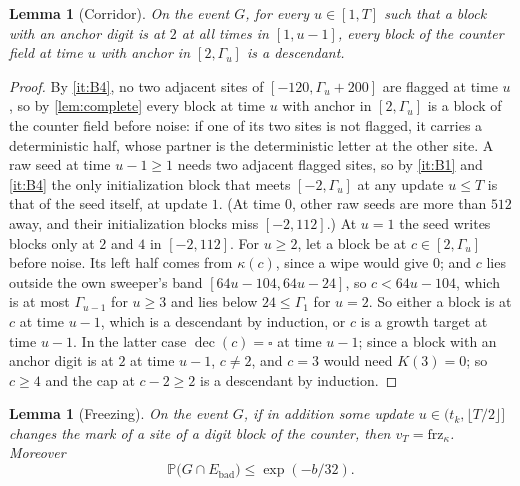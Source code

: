 \documentclass[11pt]{article}
\theoremstyle{plain}
\newtheorem{lemma}[theorem]{Lemma}
\theoremstyle{definition}
\theoremstyle{remark}
\newcommand{\Prob}{\mathbb P}
\newcommand{\blank}{\square}
\newcommand{\frz}{\mathrm{frz}}
\newcommand{\dec}{\operatorname{dec}}
\begin{document}
\begin{lemma}[Corridor]\label{lem:corridor}
On the event $G$, for every $u\in[1,T]$ such that a block with an anchor digit is at $2$ at all times in $[1,u-1]$, every block of the counter field at time $u$ with anchor in $[2,\Gamma_u]$ is a descendant.
\end{lemma}

\begin{proof}
By \ref{it:B4}, no two adjacent sites of $[-120,\Gamma_u+200]$ are flagged at time $u$, so by \cref{lem:complete} every block at time $u$ with anchor in $[2,\Gamma_u]$ is a block of the counter field before noise: if one of its two sites is not flagged, it carries a deterministic half, whose partner is the deterministic letter at the other site. A raw seed at time $u-1\ge1$ needs two adjacent flagged sites, so by \ref{it:B1} and \ref{it:B4} the only initialization block that meets $[-2,\Gamma_u]$ at any update $u\le T$ is that of the seed itself, at update $1$. (At time $0$, other raw seeds are more than $512$ away, and their initialization blocks miss $[-2,112]$.) At $u=1$ the seed writes blocks only at $2$ and $4$ in $[-2,112]$. For $u\ge2$, let a block be at $c\in[2,\Gamma_u]$ before noise. Its left half comes from $\kappa(c)$, since a wipe would give $0$; and $c$ lies outside the own sweeper's band $[64u-104,64u-24]$, so $c<64u-104$, which is at most $\Gamma_{u-1}$ for $u\ge3$ and lies below $24\le\Gamma_1$ for $u=2$. So either a block is at $c$ at time $u-1$, which is a descendant by induction, or $c$ is a growth target at time $u-1$. In the latter case $\dec(c)=\blank$ at time $u-1$; since a block with an anchor digit is at $2$ at time $u-1$, $c\ne2$, and $c=3$ would need $K(3)=0$; so $c\ge4$ and the cap at $c-2\ge2$ is a descendant by induction.
\end{proof}

\begin{lemma}[Freezing]\label{lem:freeze}
On the event $G$, if in addition some update $u\in(t_k,\lfloor T/2\rfloor]$ changes the mark of a site of a digit block of the counter, then $v_T=\frz_\kappa$. Moreover
\[
\Prob\bigl(G\cap E_{\mathrm{bad}}\bigr)\le\exp(-b/32).
\]
\end{lemma}
\end{document}

